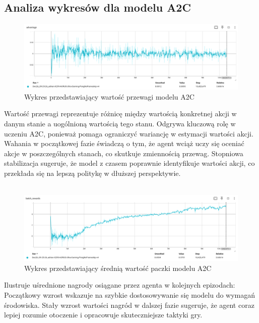 \documentclass[a4paper, 12pt]{article}
\numberwithin{equation}{section}
\begin{document}
    \subsection{Analiza wykresów dla modelu A2C} 
    \begin{figure}[H]
        \centering
        \includegraphics[width=\textwidth]{pictures/A2C_advantage.png}
        \caption{Wykres przedstawiający wartość przewagi modelu A2C}
    \end{figure}
    Wartość przewagi reprezentuje różnicę między wartością konkretnej akcji w danym stanie a uogólnioną wartością tego stanu. Odgrywa kluczową rolę w uczeniu A2C, ponieważ pomaga ograniczyć wariancję w estymacji wartości akcji.
    Wahania w początkowej fazie świadczą o tym, że agent wciąż uczy się oceniać akcje w poszczególnych stanach, co skutkuje zmiennością przewag. Stopniowa stabilizacja sugeruje, że model z czasem poprawnie identyfikuje wartości akcji, co przekłada się na lepszą politykę w dłuższej perspektywie.
    \\ \\ 
    \begin{figure}[H]
        \centering
        \includegraphics[width=\textwidth]{pictures/A2C_batch_rewards.png}
        \caption{Wykres przedstawiający średnią wartość paczki modelu A2C}
    \end{figure}
    Ilustruje uśrednione nagrody osiągane przez agenta w kolejnych epizodach:
    Początkowy wzrost wskazuje na szybkie dostosowywanie się modelu do wymagań środowiska. Stały wzrost wartości nagród w dalszej fazie sugeruje, że agent coraz lepiej rozumie otoczenie i opracowuje skuteczniejsze taktyki gry.
    \\ \\ 
\end{document}
